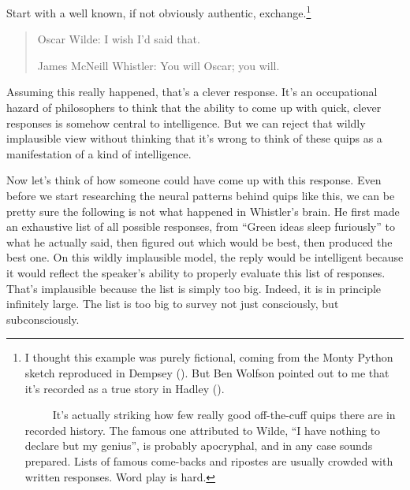 \documentclass[
  11pt,
  letterpaper,
  DIV=11,
  numbers=noendperiod,
  twoside]{scrartcl}
\begin{document}
Start with a well known, if not obviously authentic,
exchange.\footnote{I thought this example was purely fictional, coming
  from the Monty Python sketch reproduced in Dempsey
  (). But Ben Wolfson pointed out
  to me that it's recorded as a true story in Hadley
  ().

  ~~~~~It's actually striking how few really good off-the-cuff quips
  there are in recorded history. The famous one attributed to Wilde, ``I
  have nothing to declare but my genius'', is probably apocryphal, and
  in any case sounds prepared. Lists of famous come-backs and ripostes
  are usually crowded with written responses. Word play is hard.}

\begin{quote}
Oscar Wilde: I wish I'd said that.

James McNeill Whistler: You will Oscar; you will.
\end{quote}

Assuming this really happened, that's a clever response. It's an
occupational hazard of philosophers to think that the ability to come up
with quick, clever responses is somehow central to intelligence. But we
can reject that wildly implausible view without thinking that it's wrong
to think of these quips as a manifestation of a kind of intelligence.

Now let's think of how someone could have come up with this response.
Even before we start researching the neural patterns behind quips like
this, we can be pretty sure the following is not what happened in
Whistler's brain. He first made an exhaustive list of all possible
responses, from ``Green ideas sleep furiously'' to what he actually
said, then figured out which would be best, then produced the best one.
On this wildly implausible model, the reply would be intelligent because
it would reflect the speaker's ability to properly evaluate this list of
responses. That's implausible because the list is simply too big.
Indeed, it is in principle infinitely large. The list is too big to
survey not just consciously, but subconsciously.
\end{document}
